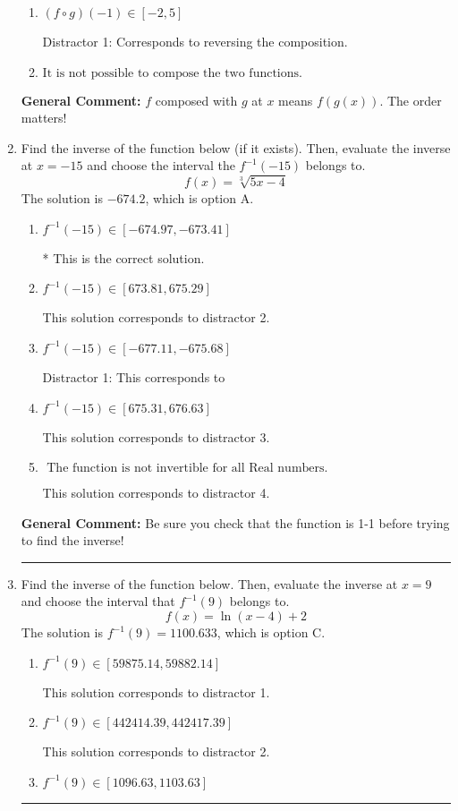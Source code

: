 \documentclass{extbook}[14pt]
\newcommand{\litem}[1]{\item #1

\rule{\textwidth}{0.4pt}}
\begin{document}
\begin{enumerate}
{\begin{enumerate}[label=\Alph*.]
 Distractor 3: Corresponds to being slightly off from the solution.
\item \( (f \circ g)(-1) \in [-2, 5] \)

 Distractor 1: Corresponds to reversing the composition.
\item \( \text{It is not possible to compose the two functions.} \)


\end{enumerate}

\textbf{General Comment:} $f$ composed with $g$ at $x$ means $f(g(x))$. The order matters!
}
\litem{
Find the inverse of the function below (if it exists). Then, evaluate the inverse at $x = -15$ and choose the interval the $f^{-1}(-15)$ belongs to.
\[ f(x) = \sqrt[3]{5 x - 4} \]The solution is \( -674.2 \), which is option A.\begin{enumerate}[label=\Alph*.]
\item \( f^{-1}(-15) \in [-674.97, -673.41] \)

* This is the correct solution.
\item \( f^{-1}(-15) \in [673.81, 675.29] \)

 This solution corresponds to distractor 2.
\item \( f^{-1}(-15) \in [-677.11, -675.68] \)

 Distractor 1: This corresponds to 
\item \( f^{-1}(-15) \in [675.31, 676.63] \)

 This solution corresponds to distractor 3.
\item \( \text{ The function is not invertible for all Real numbers. } \)

 This solution corresponds to distractor 4.
\end{enumerate}

\textbf{General Comment:} Be sure you check that the function is 1-1 before trying to find the inverse!
}
\litem{
Find the inverse of the function below. Then, evaluate the inverse at $x = 9$ and choose the interval that $f^{-1}(9)$ belongs to.
\[ f(x) = \ln{(x-4)}+2 \]The solution is \( f^{-1}(9) = 1100.633 \), which is option C.\begin{enumerate}[label=\Alph*.]
\item \( f^{-1}(9) \in [59875.14, 59882.14] \)

 This solution corresponds to distractor 1.
\item \( f^{-1}(9) \in [442414.39, 442417.39] \)

 This solution corresponds to distractor 2.
\item \( f^{-1}(9) \in [1096.63, 1103.63] \)


\end{enumerate}}
\end{enumerate}
\end{document}
